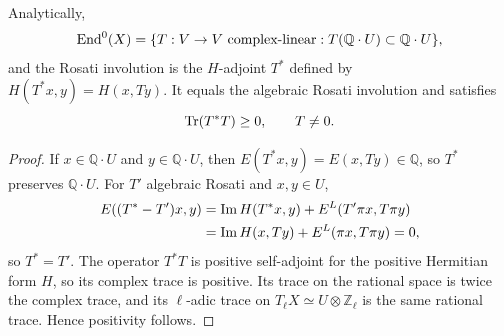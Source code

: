 \begin{proposition}
\label{mumford-prop-analytic-rosati-positivity}
Analytically,
\[
{\rm End}^0(X)=\{T:V\to V\text{ complex-linear}:T(\mathbb Q\cdot U)\subset\mathbb Q\cdot U\},
\]
and the Rosati involution is the $H$-adjoint $T^*$ defined by
$H(T^*x,y)=H(x,Ty)$. It equals the algebraic Rosati involution and satisfies
\[
{\rm Tr}(T^*T)\ge0,\qquad T\ne0.
\]
\end{proposition}
\begin{proof}
If $x\in\mathbb Q\cdot U$ and $y\in\mathbb Q\cdot U$, then
$E(T^*x,y)=E(x,Ty)\in\mathbb Q$, so $T^*$ preserves $\mathbb Q\cdot U$.
For $T'$ algebraic Rosati and $x,y\in U$,
\[
\begin{aligned}
 E((T^*-T')x,y)&={\rm Im}\,H(T^*x,y)+E^L(T'\pi x,T\pi y)\\
 &={\rm Im}\,H(x,Ty)+E^L(\pi x,T\pi y)=0,
\end{aligned}
\]
so $T^*=T'$. The operator $T^*T$ is positive self-adjoint for the positive
Hermitian form $H$, so its complex trace is positive. Its trace on the rational
space is twice the complex trace, and its $\ell$-adic trace on
$T_\ell X\simeq U\otimes\mathbb Z_\ell$ is the same rational trace. Hence
positivity follows.
\end{proof}
